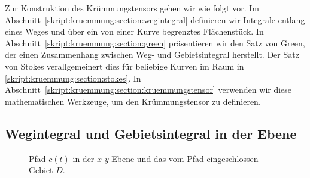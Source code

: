 Zur Konstruktion des Krümmungstensors gehen wir wie folgt vor.
Im Abschnitt~\ref{skript:kruemmung:section:wegintegral} definieren
wir Integrale entlang eines Weges und über ein von einer Kurve begrenztes
Flächenstück.
In Abschnitt~\ref{skript:kruemmung:section:green} präsentieren
wir den Satz von Green, der einen Zusammenhang zwischen Weg- und
Gebietsintegral herstellt.
Der Satz von Stokes verallgemeinert dies für beliebige Kurven
im Raum in \ref{skript:kruemmung:section:stokes}.
In Abschnitt~\ref{skript:kruemmung:section:kruemmungstensor}
verwenden wir diese mathematischen Werkzeuge, um den Krümmungstensor
zu definieren.

\subsection{Wegintegral und Gebietsintegral in der Ebene%
\label{skript:kruemmung:section:wegintegral}}
\begin{figure}
\centering
{}
\caption{Pfad $c(t)$ in der $x$-$y$-Ebene und das vom Pfad eingeschlossen
Gebiet $D$.
\label{skript:kruemmung:pfad}}
\end{figure}
